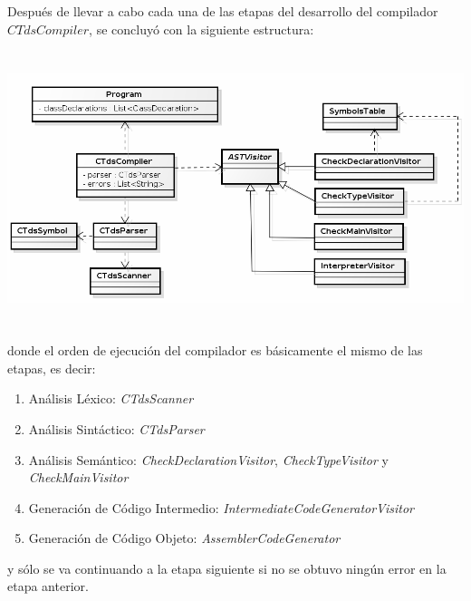 \documentclass[11pt,a4paper]{article}
\begin{document}
Después de llevar a cabo cada una de las etapas del desarrollo del compilador $CTdsCompiler$, se concluyó con la siguiente estructura:
\begin{center}
\includegraphics[width=14cm,height=8cm]{CTdsCompilerDiagram.png}
\end{center}
donde el orden de ejecución del compilador es básicamente el mismo de las etapas, es decir:
\begin{enumerate}
	\item Análisis Léxico: \textit{CTdsScanner}
	\item Análisis Sintáctico: \textit{CTdsParser}
	\item Análisis Semántico: \textit{CheckDeclarationVisitor}, \textit{CheckTypeVisitor} y \textit{CheckMainVisitor}
	\item Generación de Código Intermedio: \textit{IntermediateCodeGeneratorVisitor}
	\item Generación de Código Objeto: \textit{AssemblerCodeGenerator}
\end{enumerate}
y sólo se va continuando a la etapa siguiente si no se obtuvo ningún error en la etapa anterior.
\end{document}
